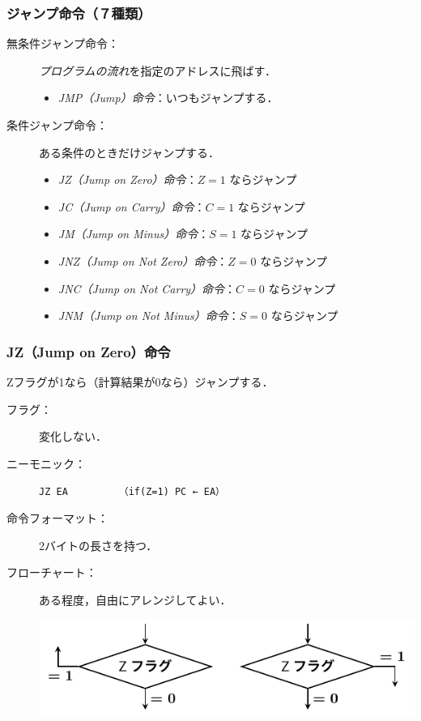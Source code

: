 \documentclass{beamer}                 %
\begin{document}
\begin{frame}
  \frametitle{ジャンプ命令（７種類）}
  \begin{description}
  \item[無条件ジャンプ命令：]\emph{プログラムの流れ}を指定のアドレスに飛ばす．
    \begin{itemize}
      \item \emph{JMP（Jump）命令}：いつもジャンプする．
    \end{itemize}
    \vfill
  \item[条件ジャンプ命令：]ある条件のときだけジャンプする．
    \begin{itemize}
      \item \emph{JZ（Jump on Zero）命令}：$Z=1$ ならジャンプ
        \vfill
      \item \emph{JC（Jump on Carry）命令}：$C=1$ ならジャンプ
        \vfill
      \item \emph{JM（Jump on Minus）命令}：$S=1$ ならジャンプ
        \vfill
      \item \emph{JNZ（Jump on Not Zero）命令}：$Z=0$ ならジャンプ
        \vfill
      \item \emph{JNC（Jump on Not Carry）命令}：$C=0$ ならジャンプ
        \vfill
      \item \emph{JNM（Jump on Not Minus）命令}：$S=0$ ならジャンプ
    \end{itemize}
  \end{description}
  \vfill
\end{frame}

\begin{frame}
  \frametitle{JZ（Jump on Zero）命令}
  Zフラグが1なら（計算結果が0なら）ジャンプする．
  \vfill
  \begin{description}
  \item[フラグ：] 変化しない．
    \vfill

  \item[ニーモニック：]\texttt{JZ EA}~~~~~~~~~\texttt{（if(Z=1) PC ← EA）}
    \vfill

  \item[命令フォーマット：] 2バイトの長さを持つ．\\
    \vfill

  \item[フローチャート：] ある程度，自由にアレンジしてよい．\\
    \centerline{\includegraphics[scale=0.7]{../Tikz/jz.pdf}}
  \end{description}
  \vfill
\end{frame}
\end{document}
